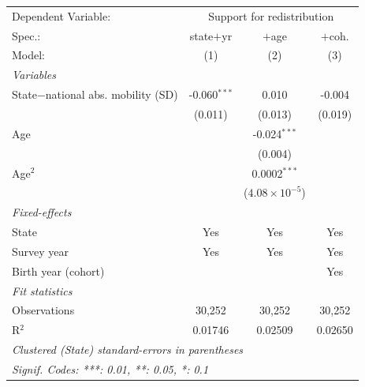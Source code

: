    \begin{tabular}{lccc}
      \tabularnewline \midrule \midrule
      Dependent Variable: & \multicolumn{3}{c}{Support for redistribution}\\
      Spec.:                              & state$+$yr     & $+$age                  & $+$coh. \\   
      Model:                              & (1)            & (2)                     & (3)\\  
      \midrule
      \emph{Variables}\\
      State$-$national abs. mobility (SD) & -0.060$^{***}$ & 0.010                   & -0.004\\   
                                          & (0.011)        & (0.013)                 & (0.019)\\   
      Age                                 &                & -0.024$^{***}$          &   \\   
                                          &                & (0.004)                 &   \\   
      Age$^2$                             &                & 0.0002$^{***}$          &   \\   
                                          &                & ($4.08\times 10^{-5}$)  &   \\   
      \midrule
      \emph{Fixed-effects}\\
      State                               & Yes            & Yes                     & Yes\\  
      Survey year                         & Yes            & Yes                     & Yes\\  
      Birth year (cohort)                 &                &                         & Yes\\  
      \midrule
      \emph{Fit statistics}\\
      Observations                        & 30,252         & 30,252                  & 30,252\\  
      R$^2$                               & 0.01746        & 0.02509                 & 0.02650\\  
      \midrule \midrule
      \multicolumn{4}{l}{\emph{Clustered (State) standard-errors in parentheses}}\\
      \multicolumn{4}{l}{\emph{Signif. Codes: ***: 0.01, **: 0.05, *: 0.1}}\\
   \end{tabular}
\vspace{3pt}\par{}
